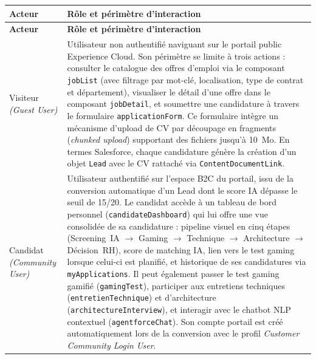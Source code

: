 \begin{longtable}{|p{3.5cm}|p{11.5cm}|}
\hline
\textbf{Acteur} & \textbf{Rôle et périmètre d'interaction} \\
\hline
\endfirsthead

\hline
\textbf{Acteur} & \textbf{Rôle et périmètre d'interaction} \\
\hline
\endhead

\endfoot

\hline
\endlastfoot

Visiteur \newline\textit{(Guest User)} & Utilisateur non authentifié naviguant sur le portail public Experience Cloud. Son périmètre se limite à trois actions : consulter le catalogue des offres d'emploi via le composant \texttt{jobList} (avec filtrage par mot-clé, localisation, type de contrat et département), visualiser le détail d'une offre dans le composant \texttt{jobDetail}, et soumettre une candidature à travers le formulaire \texttt{applicationForm}. Ce formulaire intègre un mécanisme d'upload de CV par découpage en fragments (\textit{chunked upload}) supportant des fichiers jusqu'à 10~Mo. En termes Salesforce, chaque candidature génère la création d'un objet \texttt{Lead} avec le CV rattaché via \texttt{ContentDocumentLink}. \\
\hline

Candidat \newline\textit{(Community User)} & Utilisateur authentifié sur l'espace B2C du portail, issu de la conversion automatique d'un Lead dont le score IA dépasse le seuil de 15/20. Le candidat accède à un tableau de bord personnel (\texttt{candidateDashboard}) qui lui offre une vue consolidée de sa candidature : pipeline visuel en cinq étapes (Screening~IA $\rightarrow$ Gaming $\rightarrow$ Technique $\rightarrow$ Architecture $\rightarrow$ Décision~RH), score de matching IA, lien vers le test gaming lorsque celui-ci est planifié, et historique de ses candidatures via \texttt{myApplications}. Il peut également passer le test gaming gamifié (\texttt{gamingTest}), participer aux entretiens techniques (\texttt{entretienTechnique}) et d'architecture (\texttt{architectureInterview}), et interagir avec le chatbot NLP contextuel (\texttt{agentforceChat}). Son compte portail est créé automatiquement lors de la conversion avec le profil \textit{Customer Community Login User}. \\
\hline


\end{longtable}
